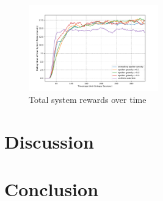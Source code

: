 \begin{figure}[t]
    \centering
    \includegraphics[width=0.5\textwidth]{figures/rewards}
    \caption{Total system rewards over time}
    \label{fig:system_rewards}
\end{figure}

\section*{Discussion}

\section*{Conclusion}

